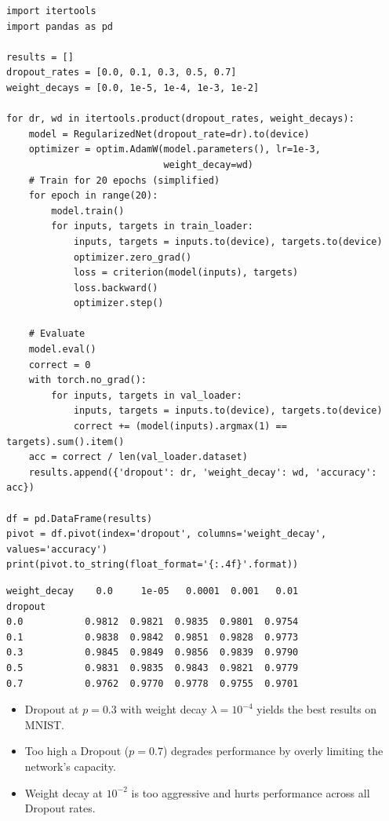 \begin{codeblock}[title=\textbf{Ablation study: Dropout rate and Weight Decay}]
\begin{verbatim}
import itertools
import pandas as pd

results = []
dropout_rates = [0.0, 0.1, 0.3, 0.5, 0.7]
weight_decays = [0.0, 1e-5, 1e-4, 1e-3, 1e-2]

for dr, wd in itertools.product(dropout_rates, weight_decays):
    model = RegularizedNet(dropout_rate=dr).to(device)
    optimizer = optim.AdamW(model.parameters(), lr=1e-3,
                            weight_decay=wd)
    # Train for 20 epochs (simplified)
    for epoch in range(20):
        model.train()
        for inputs, targets in train_loader:
            inputs, targets = inputs.to(device), targets.to(device)
            optimizer.zero_grad()
            loss = criterion(model(inputs), targets)
            loss.backward()
            optimizer.step()

    # Evaluate
    model.eval()
    correct = 0
    with torch.no_grad():
        for inputs, targets in val_loader:
            inputs, targets = inputs.to(device), targets.to(device)
            correct += (model(inputs).argmax(1) == targets).sum().item()
    acc = correct / len(val_loader.dataset)
    results.append({'dropout': dr, 'weight_decay': wd, 'accuracy': acc})

df = pd.DataFrame(results)
pivot = df.pivot(index='dropout', columns='weight_decay', values='accuracy')
print(pivot.to_string(float_format='{:.4f}'.format))
\end{verbatim}
\end{codeblock}

\begin{codeoutput}
\begin{verbatim}
weight_decay    0.0     1e-05   0.0001  0.001   0.01
dropout
0.0           0.9812  0.9821  0.9835  0.9801  0.9754
0.1           0.9838  0.9842  0.9851  0.9828  0.9773
0.3           0.9845  0.9849  0.9856  0.9839  0.9790
0.5           0.9831  0.9835  0.9843  0.9821  0.9779
0.7           0.9762  0.9770  0.9778  0.9755  0.9701
\end{verbatim}
\end{codeoutput}

\begin{remark}[Observations]
\begin{itemize}
  \item Dropout at $p=0.3$ with weight decay $\lambda=10^{-4}$ yields the
    best results on MNIST.
  \item Too high a Dropout ($p=0.7$) degrades performance by overly
    limiting the network's capacity.
  \item Weight decay at $10^{-2}$ is too aggressive and hurts performance
    across all Dropout rates.
\end{itemize}
\end{remark}

